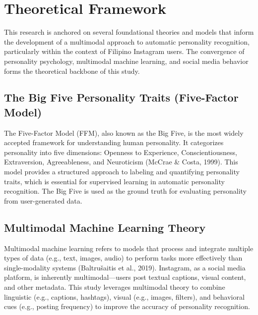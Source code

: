 %
%
%                 

\chapter{Theoretical Framework}
\label{sec:theoframework}

This research is anchored on several foundational theories and models that inform the development of a multimodal approach to automatic personality recognition, particularly within the context of Filipino Instagram users. The convergence of personality psychology, multimodal machine learning, and social media behavior forms the theoretical backbone of this study.

\section{The Big Five Personality Traits (Five-Factor Model)}
The Five-Factor Model (FFM), also known as the Big Five, is the most widely accepted framework for understanding human personality. It categorizes personality into five dimensions: Openness to Experience, Conscientiousness, Extraversion, Agreeableness, and Neuroticism (McCrae \& Costa, 1999). This model provides a structured approach to labeling and quantifying personality traits, which is essential for supervised learning in automatic personality recognition. The Big Five is used as the ground truth for evaluating personality from user-generated data.

\section{Multimodal Machine Learning Theory}
Multimodal machine learning refers to models that process and integrate multiple types of data (e.g., text, images, audio) to perform tasks more effectively than single-modality systems (Baltrušaitis et al., 2019). Instagram, as a social media platform, is inherently multimodal—users post textual captions, visual content, and other metadata. This study leverages multimodal theory to combine linguistic (e.g., captions, hashtags), visual (e.g., images, filters), and behavioral cues (e.g., posting frequency) to improve the accuracy of personality recognition.

